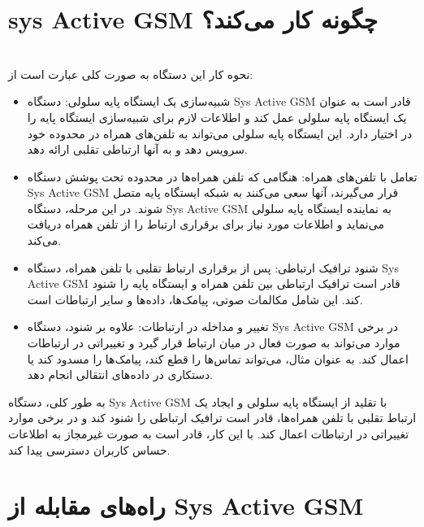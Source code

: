 \documentclass{article}
\begin{document}
\section{sys Active GSM چگونه کار می‌کند؟}
\leavevmode
\\
نحوه کار این دستگاه به صورت کلی عبارت است از:

\begin{itemize}

\item 
شبیه‌سازی یک ایستگاه پایه سلولی: دستگاه Sys Active GSM قادر است به عنوان یک ایستگاه پایه سلولی عمل کند و اطلاعات لازم برای شبیه‌سازی ایستگاه پایه را در اختیار دارد. این ایستگاه پایه سلولی می‌تواند به تلفن‌های همراه در محدوده خود سرویس دهد و به آنها ارتباطی تقلبی ارائه دهد.

\item 
تعامل با تلفن‌های همراه: هنگامی که تلفن همراه‌ها در محدوده تحت پوشش دستگاه Sys Active GSM قرار می‌گیرند، آنها سعی می‌کنند به شبکه ایستگاه پایه متصل شوند. در این مرحله، دستگاه Sys Active GSM به نماینده ایستگاه پایه سلولی می‌نماید و اطلاعات مورد نیاز برای برقراری ارتباط را از تلفن همراه دریافت می‌کند.

\item 
شنود ترافیک ارتباطی: پس از برقراری ارتباط تقلبی با تلفن همراه، دستگاه Sys Active GSM قادر است ترافیک ارتباطی بین تلفن همراه و ایستگاه پایه را شنود کند. این شامل مکالمات صوتی، پیامک‌ها، داده‌ها و سایر ارتباطات است.

\item 
تغییر و مداخله در ارتباطات: علاوه بر شنود، دستگاه Sys Active GSM در برخی موارد می‌تواند به صورت فعال در میان ارتباط قرار گیرد و تغییراتی در ارتباطات اعمال کند. به عنوان مثال، می‌تواند تماس‌ها را قطع کند، پیامک‌ها را مسدود کند یا دستکاری در داده‌های انتقالی انجام دهد.

\end{itemize}

به طور کلی، دستگاه Sys Active GSM با تقلید از ایستگاه پایه سلولی و ایجاد یک ارتباط تقلبی با تلفن همراه‌ها، قادر است ترافیک ارتباطی را شنود کند و در برخی موارد تغییراتی در ارتباطات اعمال کند. با این کار، قادر است به صورت غیرمجاز به اطلاعات حساس کاربران دسترسی پیدا کند.
\\

\section{راه‌های مقابله از Sys Active GSM}
\leavevmode
\\
\end{document}
